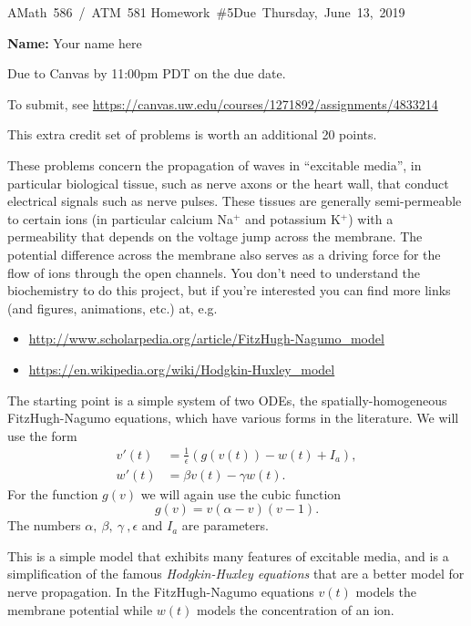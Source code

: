 \documentclass[10pt]{article}
\begin{document}
\hfill\vbox{\hbox{AMath 586 / ATM 581}
\hbox{Homework \#5}\hbox{Due Thursday, June 13, 2019}}

{\bf Name:} Your name here
\vskip 5pt

Due to Canvas by 11:00pm PDT on the due date.

To submit, see \url{https://canvas.uw.edu/courses/1271892/assignments/4833214}

This extra credit set of problems is worth an additional 20 points.


These problems concern the propagation of waves in ``excitable media'', in
particular biological tissue, such as nerve axons or the heart wall, that
conduct electrical signals such as nerve pulses.  These tissues are
generally semi-permeable to certain ions (in particular calcium Na$^+$ and
potassium K$^+$) with a permeability that depends on the voltage jump across
the membrane.  The potential difference across the membrane also serves as a
driving force for the flow of ions through the open channels.  You don't
need to understand the biochemistry to do this project, but if you're interested
you can find more links (and figures, animations, etc.) at, e.g.
\begin{itemize}
\item \url{http://www.scholarpedia.org/article/FitzHugh-Nagumo_model}
\item \url{https://en.wikipedia.org/wiki/Hodgkin-Huxley_model}
\end{itemize}

The starting point is a simple system of two ODEs, the spatially-homogeneous
FitzHugh-Nagumo
equations, which have various forms in the literature.  We will use the form
\begin{equation}\label{FHNode}
\begin{split}
v'(t) &= \frac 1 \epsilon (g(v(t)) - w(t) + I_a),\\
w'(t) &= \beta v(t) - \gamma w(t).
\end{split}
\end{equation} 
For the function $g(v)$ we will again use the cubic function
\begin{equation}\label{fv}
g(v) = v(\alpha - v)(v-1).
\end{equation} 
The  numbers $\alpha,~\beta,~\gamma~,\epsilon$ and $I_a$ are parameters.

This is a simple model that exhibits many features of excitable media, and
is a simplification of the famous {\it Hodgkin-Huxley equations} that are a 
better model for nerve propagation.  In the FitzHugh-Nagumo equations 
$v(t)$ models the membrane potential while $w(t)$ models the concentration
of an ion.
\end{document}
